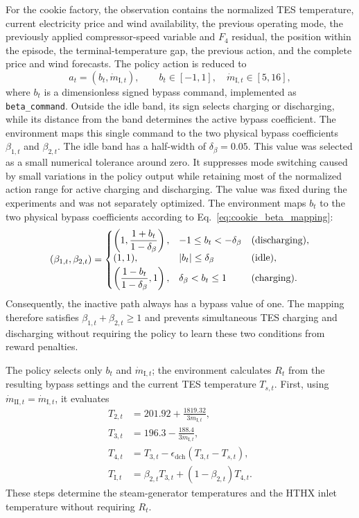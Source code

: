 \documentclass[12pt]{article}
\begin{document}
For the cookie factory, the observation contains the normalized TES
temperature, current electricity price and wind availability, the previous
operating mode, the previously applied compressor-speed variable and $F_4$
residual, the position within the episode, the terminal-temperature gap, the
previous action, and the complete price and wind forecasts. The policy action
is reduced to
\[
a_t=\left(b_t,\dot{m}_{\mathrm{I},t}\right),
\qquad b_t\in[-1,1],\quad \dot{m}_{\mathrm{I},t}\in[5,16],
\]
where $b_t$ is a dimensionless signed bypass command, implemented as
\texttt{beta\_command}. Outside the idle band, its sign selects charging or
discharging, while its distance from the band determines the active bypass
coefficient. The
environment maps this single command to the two physical bypass coefficients
$\beta_{1,t}$ and $\beta_{2,t}$. The idle band has a half-width of
$\delta_\beta=0.05$. This value was selected as a small numerical tolerance
around zero. It suppresses mode switching caused by small variations in the
policy output while retaining most of the normalized action range for active
charging and discharging. The value was fixed during the experiments and was
not separately optimized. The environment maps $b_t$ to the two physical
bypass coefficients according to Eq.~\eqref{eq:cookie_beta_mapping}:
\begin{equation}
\left(\beta_{1,t},\beta_{2,t}\right)=
\left\{\begin{array}{@{}l@{\quad}l@{\quad}l@{}}
\displaystyle\left(1,\frac{1+b_t}{1-\delta_\beta}\right),
    & -1\leq b_t<-\delta_\beta & \text{(discharging)},\\[2mm]
(1,1),
    & |b_t|\leq\delta_\beta & \text{(idle)},\\[1mm]
\displaystyle\left(\frac{1-b_t}{1-\delta_\beta},1\right),
    & \delta_\beta<b_t\leq1 & \text{(charging)}.
\end{array}\right.
\label{eq:cookie_beta_mapping}
\end{equation}
Consequently, the inactive path always has a bypass value of one. The mapping
therefore satisfies $\beta_{1,t}+\beta_{2,t}\geq1$ and prevents simultaneous TES
charging and discharging without requiring the policy to learn these two
conditions from reward penalties.

The policy selects only $b_t$ and $\dot{m}_{\mathrm{I},t}$; the environment
calculates $R_t$ from the resulting bypass settings and the current TES
temperature $T_{s,t}$. First, using
$\dot{m}_{\mathrm{II},t}=\dot{m}_{\mathrm{I},t}$, it evaluates
\begin{align*}
T_{2,t} &= 201.92+\frac{1819.32}{3\dot{m}_{\mathrm{I},t}},\\
T_{3,t} &= 196.3-\frac{188.4}{3\dot{m}_{\mathrm{I},t}},\\
T_{4,t} &= T_{3,t}-\epsilon_{\mathrm{dch}}(T_{3,t}-T_{s,t}),\\
T_{\mathrm{I},t} &= \beta_{2,t}T_{3,t}+(1-\beta_{2,t})T_{4,t}.
\end{align*}
These steps determine the steam-generator temperatures and the HTHX inlet
temperature without requiring $R_t$.
\end{document}
